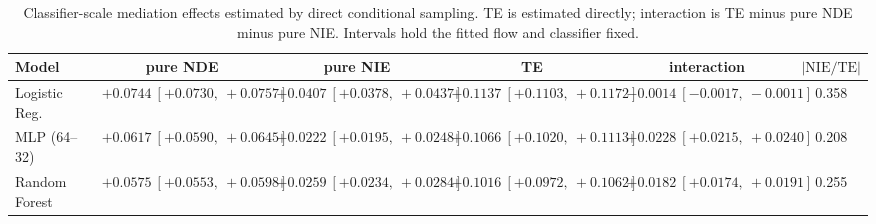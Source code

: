 \begin{table}[htbp]
  \centering
  \caption{Classifier-scale mediation effects estimated by direct conditional sampling. TE is estimated directly; interaction is TE minus pure NDE minus pure NIE. Intervals hold the fitted flow and classifier fixed.}
  \label{tab:acs_gap_overall}
  \begin{tabular}{lccccc}
    \toprule
    Model & pure NDE & pure NIE & TE & interaction & $|\mathrm{NIE}/\mathrm{TE}|$ \\
    \midrule
    Logistic Reg. & $+0.0744\ [+0.0730,\ +0.0757]$ & $+0.0407\ [+0.0378,\ +0.0437]$ & $+0.1137\ [+0.1103,\ +0.1172]$ & $-0.0014\ [-0.0017,\ -0.0011]$ & 0.358 \\
    MLP (64--32) & $+0.0617\ [+0.0590,\ +0.0645]$ & $+0.0222\ [+0.0195,\ +0.0248]$ & $+0.1066\ [+0.1020,\ +0.1113]$ & $+0.0228\ [+0.0215,\ +0.0240]$ & 0.208 \\
    Random Forest & $+0.0575\ [+0.0553,\ +0.0598]$ & $+0.0259\ [+0.0234,\ +0.0284]$ & $+0.1016\ [+0.0972,\ +0.1062]$ & $+0.0182\ [+0.0174,\ +0.0191]$ & 0.255 \\
    \bottomrule
  \end{tabular}
\end{table}